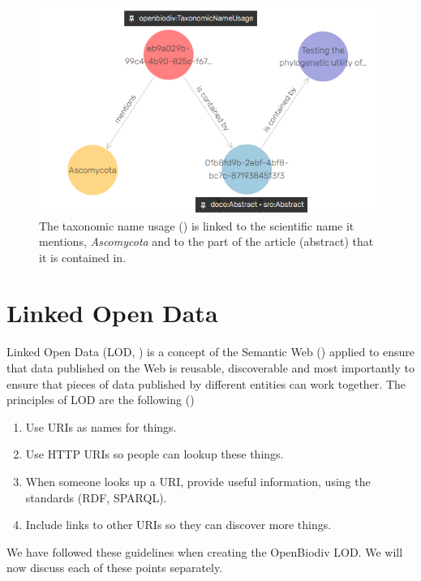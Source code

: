 \begin{figure}
\centering
\includegraphics[width=\textwidth]{Figures/tnu-vis}
\decoRule
\caption[Visual graph of a taxonomic name usage]{The taxonomic name usage () is linked to the scientific name it mentions, \emph{Ascomycota} and to the part of the article (abstract) that it is contained in.}
\label{fig:tnu-vis}
\end{figure}

\section{Linked Open Data}

Linked Open Data (LOD, \cite{heath_linked_2011}) is a concept of the Semantic Web (\cite{berners-lee_semantic_2001}) applied to ensure that data published on the Web is reusable, discoverable and most importantly to ensure that pieces of data published by different entities can work together. The principles of LOD are the following (\cite{heath_linked_2011})

\begin{enumerate}
\item{Use URIs as names for things.}
\item{Use HTTP URIs so people can lookup these things.}
\item{When someone looks up a URI, provide useful information, using the standards (RDF, SPARQL).}
\item{Include links to other URIs so they can discover more things.}
\end{enumerate}

We have followed these guidelines when creating the OpenBiodiv LOD. We will now discuss each of these points separately.

